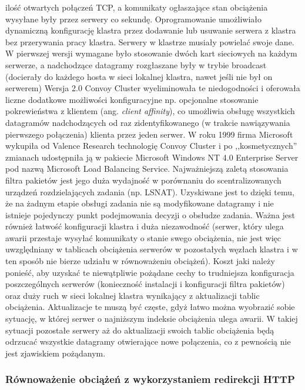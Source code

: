 ilość otwartych połączeń TCP, a komunikaty ogłaszające stan obciążenia wysyłane były przez serwery co sekundę. 
Oprogramowanie umożliwiało dynamiczną konfigurację klastra przez dodawanie lub usuwanie serwera z klastra bez 
przerywania pracy klastra. Serwery w klastrze musiały powielać swoje dane. W pierwszej wersji wymagane było 
stosowanie dwóch kart sieciowych na każdym serwerze, a nadchodzące datagramy rozgłaszane były w trybie broadcast 
(docierały do każdego hosta w sieci lokalnej klastra, nawet jeśli nie był on serwerem) Wersja 2.0 Convoy 
Cluster wyeliminowała te niedogodności i oferowała liczne dodatkowe możliwości konfiguracyjne np. opcjonalne 
stosowanie pokrewieństwa z klientem (ang. \emph{client affinity}), co umożliwia obsługę wszystkich datagramów 
nadchodzących od raz zidentyfikowanego (w trakcie nawiązywania pierwszego połączenia) klienta przez jeden 
serwer. W roku 1999 firma Microsoft wykupiła od Valence Research technologię Convoy Cluster i po 
,,kosmetycznych'' zmianach udostępniła ją w pakiecie Microsoft Windows NT 4.0 Enterprise Server pod nazwą 
Microsoft Load Balancing Service.
Najważniejszą zaletą stosowania filtra pakietów jest jego duża wydajność w porównaniu do 
scentralizowanych urządzeń rozdzielających zadania (np. LSNAT). Uzyskiwane jest to dzięki temu, że na żadnym 
etapie obsługi zadania nie są modyfikowane datagramy i nie istnieje pojedynczy punkt podejmowania decyzji o 
obsłudze zadania. Ważna jest również łatwość konfiguracji klastra i duża niezawodność (serwer, który ulega 
awarii przestaje wysyłać komunikaty o stanie swego obciążenia, nie jest więc uwzględniany w tablicach obciążenia 
serwerów w pozostałych węzłach klastra i w ten sposób nie bierze udziału w równoważeniu obciążeń). Koszt jaki 
należy ponieść, aby uzyskać te niewątpliwie pożądane cechy to trudniejsza konfiguracja poszczególnych serwerów 
(konieczność instalacji i konfiguracji filtra pakietów) oraz duży ruch w sieci lokalnej klastra wynikający z 
aktualizacji tablic obciążenia. Aktualizacje te muszą być częste, gdyż łatwo można wyobrazić sobie sytuację, w 
której serwer o najniższym indeksie obciążenia ulega awarii. W takiej sytuacji pozostałe serwery aż do 
aktualizacji swoich tablic obciążenia będą odrzucać wszystkie datagramy otwierające nowe połączenia, co z 
pewnością nie jest zjawiskiem pożądanym.

\subsubsection{Równoważenie obciążeń z wykorzystaniem redirekcji HTTP}

